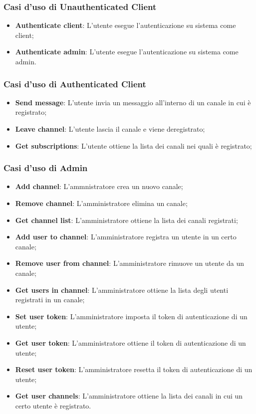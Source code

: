 		\subsubsection{Casi d'uso di Unauthenticated Client}
		\begin{itemize}
			\item \textbf{Authenticate client}: L'utente esegue l'autenticazione su sistema come client;
			\item \textbf{Authenticate admin}: L'utente esegue l'autenticazione su sistema come admin.
		\end{itemize}

		\subsubsection{Casi d'uso di Authenticated Client}
		\begin{itemize}
			\item \textbf{Send message}: L'utente invia un messaggio all'interno di un canale in cui è registrato; 
			\item \textbf{Leave channel}: L'utente lascia il canale e viene deregistrato; 
			\item \textbf{Get subscriptions}: L'utente ottiene la lista dei canali nei quali è registrato; 
		\end{itemize}

		\subsubsection{Casi d'uso di Admin}
		\begin{itemize}
			\item \textbf{Add channel}: L'ammnistratore crea un nuovo canale;
			\item \textbf{Remove channel}: L'amministratore elimina un canale;
			\item \textbf{Get channel list}: L'amministratore ottiene la lista dei canali registrati;
			\item \textbf{Add user to channel}: L'amministratore registra un utente in un certo canale;
			\item \textbf{Remove user from channel}: L'amministratore rimuove un utente da un canale;
			\item \textbf{Get users in channel}: L'amministratore ottiene la lista degli utenti registrati in un canale;
			\item \textbf{Set user token}: L'amministratore imposta il token di autenticazione di un utente;
			\item \textbf{Get user token}: L'amministratore ottiene il token di autenticazione di un utente;
			\item \textbf{Reset user token}: L'amministratore resetta il token di autenticazione di un utente;
			\item \textbf{Get user channels}: L'amministratore ottiene la lista dei canali in cui un certo utente è registrato.
		\end{itemize}
		


